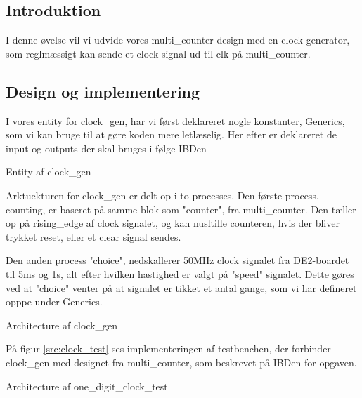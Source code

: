 \documentclass[../journal.tex]{subfiles}
\begin{document}
\subsection{Introduktion}

I denne øvelse vil vi udvide vores multi\_counter design med en clock generator, som reglmæssigt kan sende et clock signal ud til clk på multi\_counter.

\subsection{Design og implementering}

I vores entity for clock\_gen, har vi først deklareret nogle konstanter, Generics, som vi kan bruge til at gøre koden mere letlæselig. Her efter er deklareret de input og outputs der skal bruges i følge IBDen

\begin{table}[H]
    \centering
      \framebox{
        \rule{8pt}{0pt}
          
  }
  \caption{Entity af clock\_gen}	
  \label{src:clock_ent}
\end{table}

Arktuekturen for clock\_gen er delt op i to processes. Den første process, counting, er baseret på samme blok som "counter", fra multi\_counter. Den tæller op på rising\_edge af clock signalet, og kan nusltille counteren, hvis der bliver trykket reset, eller et clear signal sendes. \par
Den anden process "choice", nedskallerer 50MHz clock signalet fra DE2-boardet til 5ms og 1s, alt efter hvilken hastighed er valgt på "speed" signalet. Dette gøres ved at "choice" venter på at signalet er tikket et antal gange, som vi har defineret opppe under Generics. 

\begin{table}[H]
    \centering
      \framebox{
        \rule{8pt}{0pt}
          
  }
  \caption{Architecture af clock\_gen}	
  \label{src:clock_arch}
\end{table}

På figur \ref{src:clock_test} ses implementeringen af testbenchen, der forbinder clock\_gen med designet fra multi\_counter, som beskrevet på IBDen for opgaven.

\begin{table}[H]
    \centering
      \framebox{
        \rule{8pt}{0pt}
          
  }
  \caption{Architecture af one\_digit\_clock\_test}	
  \label{src:clock_test}
\end{table}
\end{document}
